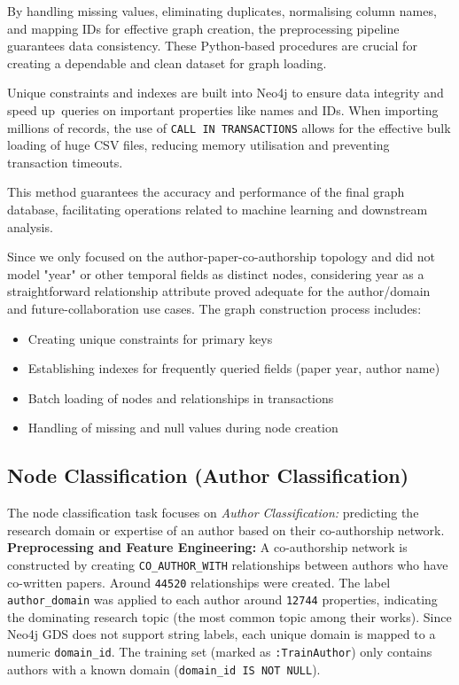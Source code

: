 \documentclass[conference]{IEEEtran}
\begin{document}
\noindent By handling missing values, eliminating duplicates, normalising column names, and mapping IDs for effective graph creation, the preprocessing pipeline guarantees data consistency.  These Python-based procedures are crucial for creating a dependable and clean dataset for graph loading.

\noindent Unique constraints and indexes are built into Neo4j to ensure data integrity and speed up queries on important properties like names and IDs.  When importing millions of records, the use of \texttt{CALL IN TRANSACTIONS} allows for the effective bulk loading of huge CSV files, reducing memory utilisation and preventing transaction timeouts.

\noindent This method guarantees the accuracy and performance of the final graph database, facilitating operations related to machine learning and downstream analysis.

\noindent Since we only focused on the author-paper-co-authorship topology and did not model "year" or other temporal fields as distinct nodes, considering year as a straightforward relationship attribute proved adequate for the author/domain and future-collaboration use cases.
\noindent The graph construction process includes:
\begin{itemize}
    \item Creating unique constraints for primary keys
    \item Establishing indexes for frequently queried fields (paper year, author name)
    \item Batch loading of nodes and relationships in transactions
    \item Handling of missing and null values during node creation
\end{itemize}

\subsection{Node Classification (Author Classification)}
\noindent The node classification task focuses on \emph{Author Classification:} predicting the research domain or expertise of an author based on their co-authorship network.
\newline \newline
\noindent \textbf{\newline Preprocessing and Feature Engineering:}
\newline
A co-authorship network is constructed by creating \texttt{CO\_AUTHOR\_WITH} relationships between authors who have co-written papers. Around \texttt{44520} relationships were created. The label \texttt{author\_domain} was applied to each author around \texttt{12744} properties, indicating the dominating research topic (the most common topic among their works). Since Neo4j GDS does not support string labels, each unique domain is mapped to a numeric \texttt{domain\_id}. The training set (marked as \texttt{:TrainAuthor}) only contains authors with a known domain (\texttt{domain\_id IS NOT NULL}).
\end{document}
